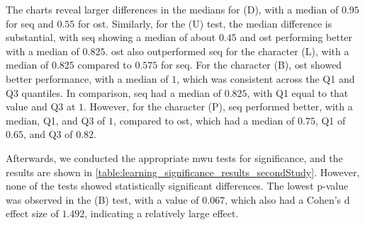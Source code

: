 The charts reveal larger differences in the medians for (D), with a median of $0.95$ for \gls{seq} and $0.55$ for \gls{ost}.
Similarly, for the (U) test, the median difference is substantial, with \gls{seq} showing a median of about $0.45$ and \gls{ost} performing better with a median of $0.825$.
\gls{ost} also outperformed \gls{seq} for the character (L), with a median of $0.825$ compared to $0.575$ for \gls{seq}.
For the character (B), \gls{ost} showed better performance, with a median of $1$, which was consistent across the Q1 and Q3 quantiles. In comparison, \gls{seq} had a median of $0.825$, with Q1 equal to that value and Q3 at $1$.
However, for the character (P), \gls{seq} performed better, with a median, Q1, and Q3 of $1$, compared to \gls{ost}, which had a median of $0.75$, Q1 of $0.65$, and Q3 of $0.82$.

Afterwards, we conducted the appropriate \gls{mwu} tests for significance, and the results are shown in \autoref{table:learning_significance_results_secondStudy}.
However, none of the tests showed statistically significant differences.
The lowest p-value was observed in the (B) test, with a value of $0.067$, which also had a Cohen's d effect size of $1.492$, indicating a relatively large effect.

\begin{table}[ht]
\caption{Results of the \gls{mwu} tests for significance grouped by the different Braille characters during training for the different Encodings with Cohen's d.}
\label{table:learning_significance_results_secondStudy_nonPar}
\end{table}

